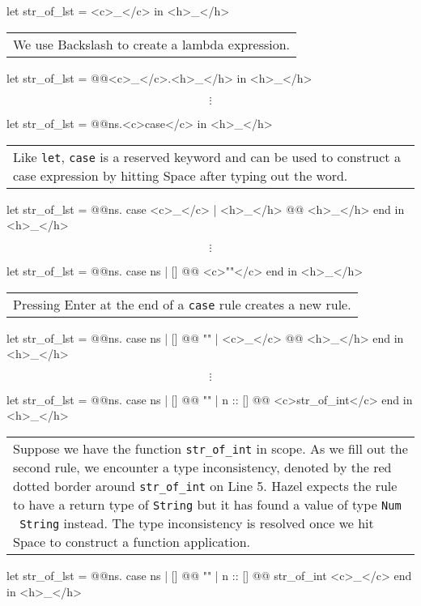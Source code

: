 \documentclass[runningheads]{llncs}
\newcommand{\Hazel}{\textsf{Hazel}\xspace}
\begin{document}
\begin{hazel}
let str_of_lst = <c>_</c> in
<h>_</h>
\end{hazel}
	\begin{tabular}{|p{\linewidth}}
	We use Backslash to create a lambda expression.
	\end{tabular}
\begin{hazel}
let str_of_lst = @\lam @<c>_</c>.{<h>_</h>} in
<h>_</h>
\end{hazel}
	\[\vdots\]
\begin{hazel}
let str_of_lst = @\lam @ns.{<c>case</c>} in
<h>_</h>
\end{hazel}
	\begin{tabular}{|p{\linewidth}}
	Like \texttt{let}, \texttt{case} is a reserved keyword and can be used to construct
	a case expression by hitting Space after typing out the word.
	\end{tabular}
\begin{hazel}
let str_of_lst = 
	@\lam @ns.{
		case <c>_</c>
		| <h>_</h> @\casearrow @ <h>_</h>
		end
	}
in
<h>_</h>
\end{hazel}
	\[\vdots\]
\begin{hazel}
let str_of_lst = 
	@\lam @ns.{
		case ns
		| [] @\casearrow @ <c>""</c>
		end
	}
in
<h>_</h>
\end{hazel}
	\begin{tabular}{|p{\linewidth}}
	Pressing Enter at the end of a \texttt{case} rule creates a new rule.
	\end{tabular}
\begin{hazel}
let str_of_lst = 
	@\lam @ns.{
		case ns
		| [] @\casearrow @ ""
		| <c>_</c>  @\casearrow @ <h>_</h>
		end
	}
in
<h>_</h>
\end{hazel}
	\[\vdots\]
\begin{hazel}
let str_of_lst = 
	@\lam @ns.{
		case ns
		| []      @\casearrow @ ""
		| n :: [] @\casearrow @ <c>str_of_int</c>
		end
	}
in
<h>_</h>
\end{hazel}
	\begin{tabular}{|p{\linewidth}}
	Suppose we have the function \texttt{str\_of\_int} in scope.
	As we fill out the second rule, we encounter a type inconsistency,
	denoted by the red dotted border around \texttt{str\_of\_int} on
	Line 5. \Hazel expects the rule to have a return type of \texttt{String}
	but it has found a value of type \texttt{Num \fnarrow~String} instead.
	The type inconsistency is resolved once we hit Space to construct
	a function application.
	\end{tabular}
\begin{hazel}
let str_of_lst = 
	@\lam @ns.{
		case ns
		| []      @\casearrow @ ""
		| n :: [] @\casearrow @ str_of_int <c>_</c>
		end
	}
in
<h>_</h>
\end{hazel}
\end{document}
